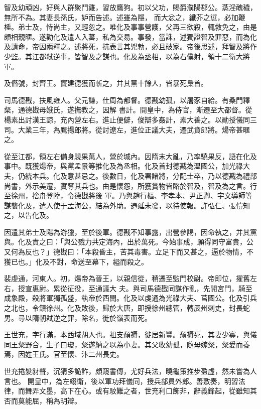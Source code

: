 \begin{pinyinscope}
 智及幼頑凶，好與人群聚鬥雞，習放鷹狗。初以父功，賜爵濮陽郡公。蒸淫醜穢，無所不為。其妻長孫氏，妒而告述。述雖為隱，
 而大忿之，纖芥之愆，必加鞭棰。弟士及，恃尚主，又輕忽之。唯化及事事營護，父再三欲殺，輒救免之，由是頗相親暱。遂勸化及遣人入蕃，私為交易。事發，當誅，述獨證智及罪惡，而為化及請命，帝因兩釋之。述將死，抗表言其兇勃，必且破家。帝後思述，拜智及將作少監。其江都弒逆事，皆智及之謀也。化及為丞相，以為右僕射，領十二衛大將軍。



 及僭號，封齊王。竇建德獲而斬之，并其黨十餘人，皆暴死梟首。



 司馬德戡，扶風雍人。父元謙，仕周為都督。德戡幼孤，以屠豕自給。有桑門釋粲，通德戡母娥氏，遂撫教之，因解
 書計。開皇中，為侍官，漸遷至大都督。從楊素出討漢王諒，充內營左右。進止便僻，俊辯多姦計，素大善之。以勛授儀同三司。大業三年，為鷹揚郎將。從討遼左，進位正議大夫，遷武賁郎將。煬帝甚暱之。



 從至江都，領左右備身驍果萬人，營於城內。因隋末大亂，乃率驍果反，語在化及事中。既獲煬帝，與黨孟景等推化及為丞相。化及首封德戡為溫國公，加光祿大夫，仍統本兵。化及意甚忌之。後數日，化及署諸將，分配士卒，乃以德戡為禮部尚書，外示美遷，實奪其兵也。由是懷怨，所獲賞物皆賂於智及，智及為之言。行至徐州，捨舟登陸，令德戡將後
 軍。乃與趙行樞、李孝本、尹正卿、宇文導師等謀襲化及，遣人使于孟海公，結為外助。遷延未發，以待使報。許弘仁、張愷知之，以告化及。



 因遣其弟士及陽為游獵，至於後軍。德戡不知事露，出營參謁，因命執之，并其黨與。化及責之曰：「與公戮力共定海內，出於萬死。今始事成，願得同守富貴，公又何為反也？」德戡曰：「本殺昏主，苦其毒害。立足下而又甚之，逼於物情，不獲已也。」化及不對，命送至幕下，縊而殺之。



 裴虔通，河東人。初，煬帝為晉王，以親信從，稍遷至監門校尉。帝即位，擢舊左右，授宣惠尉。累從征役，至通議大
 夫。與司馬德戡同謀作亂，先開宮門，騎至成象殿，殺將軍獨孤盛，執帝於西閤。化及以虔通為光祿大夫、莒國公。化及引兵之北也，令鎮徐州。化及敗後，歸於大唐，即授徐州總管，轉辰州刺史，封長蛇男。尋以隋朝弒逆之罪，除名，徙於嶺表而死。



 王世充，字行滿，本西域胡人也。祖支頹褥，徙居新豐。頹褥死，其妻少寡，與儀同王粲野合，生子曰瓊，粲遂納之以為小妻。其父收幼孤，隨母嫁粲，粲愛而養焉，因姓王氏。官至懷、汴二州長史。



 世充捲髮豺聲，沉猜多詭詐，頗窺書傳，尤好兵法，曉龜策推步盈虛，然未嘗為人言也。
 開皇中，為左翊衛，後以軍功拜儀同，授兵部員外郎。善敷奏，明習法律，而舞弄文墨，高下在心。或有駮難之者，世充利口飾非，辭義鋒起，從雖知其否而莫能屈，稱為明辯。




\end{pinyinscope}
